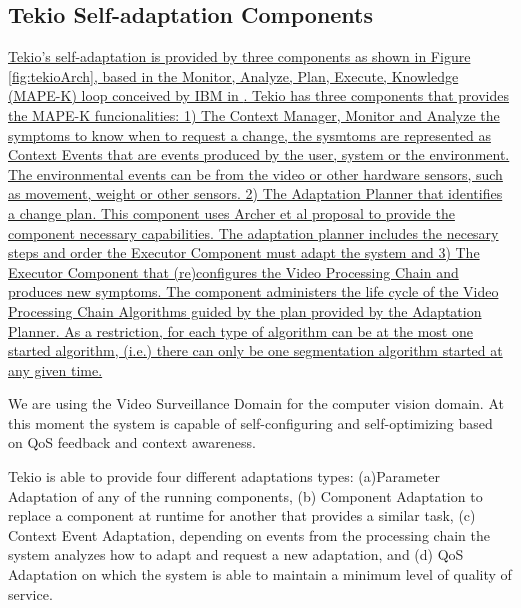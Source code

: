 \documentclass{acm_proc_article-sp}
\begin{document}
\subsection{Tekio Self-adaptation Components} 
\label{sec:sec:selfTekio}

\underline{Tekio's self-adaptation is provided by three components as shown in Figure \ref{fig:tekioArch}, based in the Monitor, Analyze, Plan, Execute, Knowledge (MAPE-K) loop conceived by IBM in \cite{IBM2005}. Tekio has three components that provides the MAPE-K funcionalities: 1) The Context Manager, Monitor and Analyze the symptoms to know when to request a change, the sysmtoms are represented as Context Events that are events produced by the user, system or the environment. The environmental events can be from the video or other hardware sensors, such as movement, weight or other sensors. 2) The Adaptation Planner that identifies a change plan. This component uses Archer et al \cite{Acher2009} proposal to provide the component necessary capabilities. The adaptation planner includes the necesary steps and order the Executor Component must adapt the system and 3) The Executor Component that (re)configures the Video Processing Chain and produces new symptoms. The component administers the life cycle of the Video Processing Chain Algorithms guided by the plan provided by the Adaptation Planner. As a restriction, for each type of algorithm can be at the most one started algorithm, (i.e.) there can only be one segmentation algorithm started at any given time.}

We are using the Video Surveillance Domain for the computer vision domain. At this moment the system is capable of self-configuring and self-optimizing based on QoS feedback and context awareness.


Tekio is able to provide four different adaptations types: (a)Parameter Adaptation of any of the running components, (b) Component Adaptation to replace a component at runtime for another that provides a similar task, (c) Context Event Adaptation, depending on events from the  processing chain the system analyzes how to adapt and request a new adaptation, and (d) QoS Adaptation on which the system is able to maintain a minimum level of quality of service. 
\end{document}
